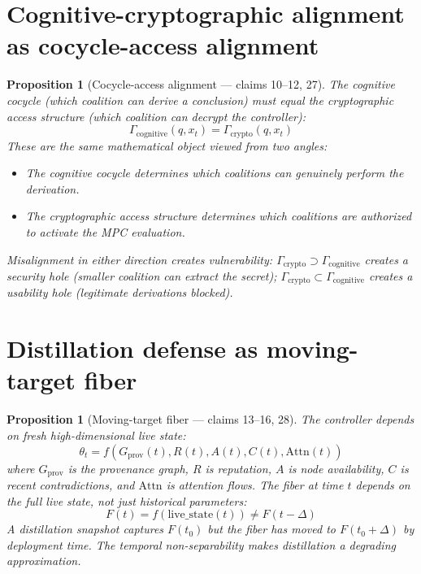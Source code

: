 \documentclass[11pt,a4paper]{article}
\newtheorem{proposition}[definition]{Proposition}
\begin{document}
\section{Cognitive-cryptographic alignment as cocycle-access alignment}

\begin{proposition}[Cocycle-access alignment --- claims 10--12, 27]
\label{prop:cocycle_access}
The cognitive cocycle (which coalition can derive a conclusion) must
equal the cryptographic access structure (which coalition can
decrypt the controller):
\[
  \Gamma_{\text{cognitive}}(q, x_t) = \Gamma_{\text{crypto}}(q, x_t)
\]
These are the same mathematical object viewed from two angles:
\begin{itemize}
  \item The cognitive cocycle determines which coalitions can
    genuinely perform the derivation.
  \item The cryptographic access structure determines which coalitions
    are authorized to activate the MPC evaluation.
\end{itemize}
Misalignment in either direction creates vulnerability:
$\Gamma_{\text{crypto}} \supset \Gamma_{\text{cognitive}}$ creates
a security hole (smaller coalition can extract the secret);
$\Gamma_{\text{crypto}} \subset \Gamma_{\text{cognitive}}$ creates
a usability hole (legitimate derivations blocked).
\end{proposition}

\section{Distillation defense as moving-target fiber}

\begin{proposition}[Moving-target fiber --- claims 13--16, 28]
\label{prop:moving}
The controller depends on fresh high-dimensional live state:
\[
  \theta_t = f(G_{\text{prov}}(t), R(t), A(t), C(t), \text{Attn}(t))
\]
where $G_{\text{prov}}$ is the provenance graph, $R$ is reputation,
$A$ is node availability, $C$ is recent contradictions, and
$\text{Attn}$ is attention flows. The fiber at time $t$ depends on
the full live state, not just historical parameters:
\[
  F(t) = f(\text{live\_state}(t)) \neq F(t-\Delta)
\]
A distillation snapshot captures $F(t_0)$ but the fiber has moved to
$F(t_0 + \Delta)$ by deployment time. The temporal non-separability
makes distillation a degrading approximation.
\end{proposition}
\end{document}
